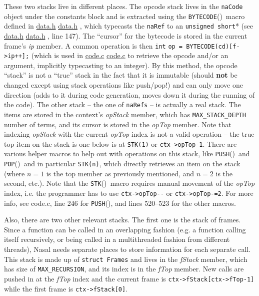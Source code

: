\documentclass{article}
\newcommand{\name}[1]{{\it #1}}
\newcommand{\type}[1]{\textcolor{type}{\tt #1}}
\newcommand{\func}[1]{\textcolor{func}{\tt #1}}
\newcommand{\globalmacro}[1]{\textcolor{func}{\tt #1}}
\newcommand{\localmacro}[1]{\textcolor{func}{\tt #1}}
\newcommand{\nasalsourcefile}[2][]{%
  \ifthenelse{\isempty{#1}}%
    {%
      \textcolor{source}{%
        \href{https://github.com/andyross/nasal/blob/master/src/#2}{#2}%
      }%
    }%
    {%
      \textcolor{source}{%
        \href{https://github.com/andyross/nasal/blob/master/src/#2\#L#1}{#2}%
      }%
    }%
}
\newcommand{\fp}{\textcolor{func}{()}}
\begin{document}
These two stacks live in different places.  The opcode stack lives in the \type{naCode} object under the constants block and is extracted using the \globalmacro{BYTECODE}\fp\ macro defined in \nasalsourcefile{data.h}, which typecasts the \type{naRef} to an \type{unsigned short}* (see \nasalsourcefile[147]{data.h}, line 147).  The ``cursor'' for the bytecode is stored in the current frame's \name{ip} member.  A common operation is then \type{int} \verb$op = $\func{BYTECODE}\verb$(cd)[f->ip++];$ (which is used in \nasalsourcefile{code.c} to retrieve the opcode and/or an argument, implicitly typecasting to an integer).  By this method, the opcode ``stack'' is not a ``true'' stack in the fact that it is immutable (should {\bf not} be changed except using stack operations like push/pop!) and can only move one direction (adds to it during code generation, moves down it during the running of the code).  The other stack -- the one of \type{naRefs} -- is actually a real stack.  The items are stored in the context's \name{opStack} member, which has \localmacro{MAX\_STACK\_DEPTH} number of terms, and its cursor is stored in the \name{opTop} member.  Note that indexing \name{opStack} with the current \name{opTop} index is not a valid operation -- the true top item on the stack is one below is at \verb$STK(1)$ or \verb$ctx->opTop-1$.  There are various helper macros to help out with operations on this stack, like \func{PUSH}\fp\ and \func{POP}\fp\ and in particular \localmacro{STK(n)}, which directly retrieves an item on the stack (where $n=1$ is the top member as previously mentioned, and $n=2$ is the second, etc.).  Note that the \func{STK}\fp\ macro requires manual movement of the \name{opTop} index, i.e. the programmer has to use \verb$ctx->opTop--$ or \verb$ctx->opTop-=2$.  For more info, see code.c, line 246 for \func{PUSH}\fp, and lines 520--523 for the other macros.

Also, there are two other relevant stacks.  The first one is the stack of frames.  Since a function can be called in an overlapping fashion (e.g. a function calling itself recursively, or being called in a multithreaded fashion from different threads), Nasal needs separate places to store information for each separate call.  This stack is made up of \type{struct Frames} and lives in the \name{fStack} member, which has size of \localmacro{MAX\_RECURSION}, and its index is in the \name{fTop} member.  New calls are pushed in at the \name{fTop} index and the current frame is \verb$ctx->fStack[ctx->fTop-1]$ while the first frame is \verb$ctx->fStack[0]$.
\end{document}
